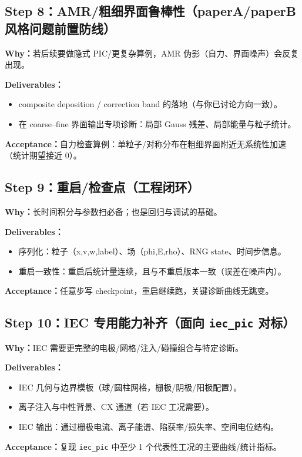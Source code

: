 \documentclass[11pt,a4paper]{ctexart}
\begin{document}
\subsection*{Step 8：AMR/粗细界面鲁棒性（paperA/paperB 风格问题前置防线）}
\textbf{Why：}若后续要做隐式 PIC/更复杂算例，AMR 伪影（自力、界面噪声）会反复出现。

\textbf{Deliverables：}
\begin{itemize}[leftmargin=2em]
\item composite deposition / correction band 的落地（与你已讨论方向一致）。
\item 在 coarse--fine 界面输出专项诊断：局部 Gauss 残差、局部能量与粒子统计。
\end{itemize}
\textbf{Acceptance：}自力检查算例：单粒子/对称分布在粗细界面附近无系统性加速（统计期望接近 0）。

\subsection*{Step 9：重启/检查点（工程闭环）}
\textbf{Why：}长时间积分与参数扫必备；也是回归与调试的基础。

\textbf{Deliverables：}
\begin{itemize}[leftmargin=2em]
\item 序列化：粒子（x,v,w,label）、场（phi,E,rho）、RNG state、时间步信息。
\item 重启一致性：重启后统计量连续，且与不重启版本一致（误差在噪声内）。
\end{itemize}
\textbf{Acceptance：}任意步写 checkpoint，重启继续跑，关键诊断曲线无跳变。

\subsection*{Step 10：IEC 专用能力补齐（面向 \texttt{iec\_pic} 对标）}
\textbf{Why：}IEC 需要更完整的电极/网格/注入/碰撞组合与特定诊断。

\textbf{Deliverables：}
\begin{itemize}[leftmargin=2em]
\item IEC 几何与边界模板（球/圆柱网格，栅极/阴极/阳极配置）。
\item 离子注入与中性背景、CX 通道（若 IEC 工况需要）。
\item IEC 输出：通过栅极电流、离子能谱、陷获率/损失率、空间电位结构。
\end{itemize}
\textbf{Acceptance：}复现 \texttt{iec\_pic} 中至少 1 个代表性工况的主要曲线/统计指标。
\end{document}
